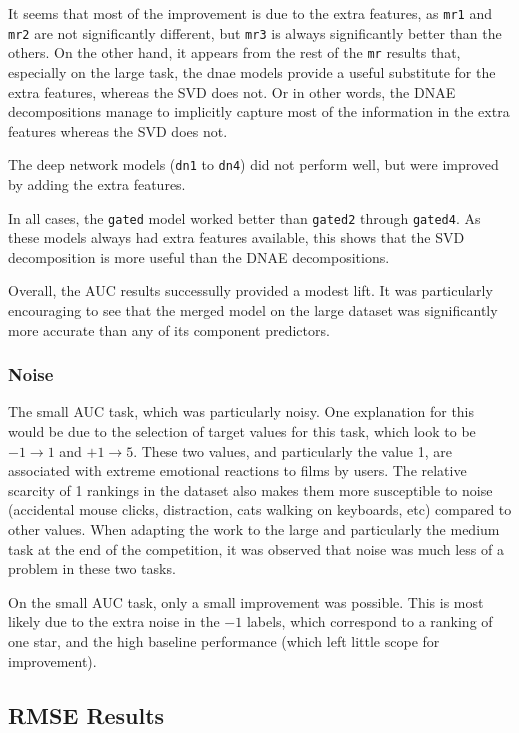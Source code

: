 \documentclass{article}
\begin{document}
It seems that most of the improvement is due to the extra features, as \texttt{mr1} and \texttt{mr2} are not significantly different, but \texttt{mr3} is always significantly better than the others.  On the other hand, it appears from the rest of the \texttt{mr} results that, especially on the large task, the dnae models provide a useful substitute for the extra features, whereas the SVD does not.  Or in other words, the DNAE decompositions manage to implicitly capture most of the information in the extra features whereas the SVD does not.

The deep network models (\texttt{dn1} to \texttt{dn4}) did not perform well, but were improved by adding the extra features.

In all cases, the \texttt{gated} model worked better than \texttt{gated2} through \texttt{gated4}.  As these models always had extra features available, this shows that the SVD decomposition is more useful than the DNAE decompositions.

Overall, the AUC results successully provided a modest lift.  It was particularly encouraging to see that the merged model on the large dataset was significantly more accurate than any of its component predictors.

\subsubsection{Noise}

The small AUC task, which was particularly noisy.
One explanation for this would be due to the selection of target values for this task, which look to be $-1 \rightarrow 1$ and $+1 \rightarrow 5$.  
These two values, and particularly the value 1, are associated with extreme emotional reactions to films by users.  
The relative scarcity of 1 rankings in the dataset also makes them more susceptible to noise (accidental mouse clicks, distraction, cats walking on keyboards, etc) compared to other values.
When adapting the work to the large and particularly the medium task at the end of the competition, it was observed that noise was much less of a problem in these two tasks.

On the small AUC task, only a small improvement was possible.  This is most likely due to the extra noise in the $-1$ labels, which correspond to a ranking of one star, and the high baseline performance (which left little scope for improvement).

\subsection{RMSE Results}
\end{document}
